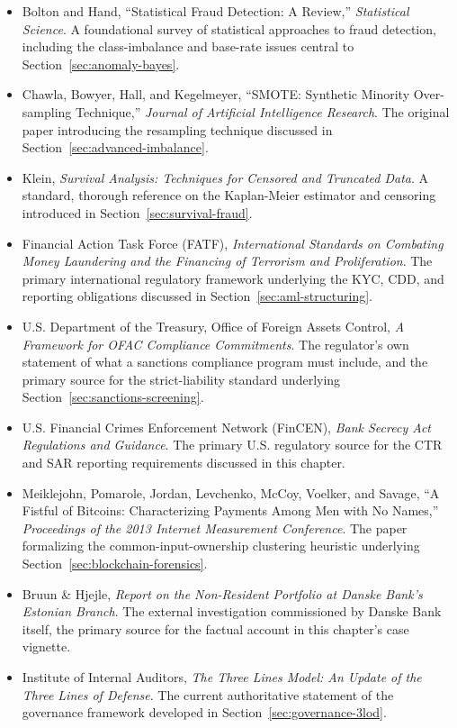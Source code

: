 \documentclass[../ai_in_finance]{subfiles}
\begin{document}
\begin{itemize}
    \item Bolton and Hand, ``Statistical Fraud Detection: A Review,'' \emph{Statistical Science}. A foundational survey of statistical approaches to fraud detection, including the class-imbalance and base-rate issues central to Section~\ref{sec:anomaly-bayes}.
    \item Chawla, Bowyer, Hall, and Kegelmeyer, ``SMOTE: Synthetic Minority Over-sampling Technique,'' \emph{Journal of Artificial Intelligence Research}. The original paper introducing the resampling technique discussed in Section~\ref{sec:advanced-imbalance}.
    \item Klein, \emph{Survival Analysis: Techniques for Censored and Truncated Data}. A standard, thorough reference on the Kaplan-Meier estimator and censoring introduced in Section~\ref{sec:survival-fraud}.
    \item Financial Action Task Force (FATF), \emph{International Standards on Combating Money Laundering and the Financing of Terrorism and Proliferation}. The primary international regulatory framework underlying the KYC, CDD, and reporting obligations discussed in Section~\ref{sec:aml-structuring}.
    \item U.S. Department of the Treasury, Office of Foreign Assets Control, \emph{A Framework for OFAC Compliance Commitments}. The regulator's own statement of what a sanctions compliance program must include, and the primary source for the strict-liability standard underlying Section~\ref{sec:sanctions-screening}.
    \item U.S. Financial Crimes Enforcement Network (FinCEN), \emph{Bank Secrecy Act Regulations and Guidance}. The primary U.S. regulatory source for the CTR and SAR reporting requirements discussed in this chapter.
    \item Meiklejohn, Pomarole, Jordan, Levchenko, McCoy, Voelker, and Savage, ``A Fistful of Bitcoins: Characterizing Payments Among Men with No Names,'' \emph{Proceedings of the 2013 Internet Measurement Conference}. The paper formalizing the common-input-ownership clustering heuristic underlying Section~\ref{sec:blockchain-forensics}.
    \item Bruun \& Hjejle, \emph{Report on the Non-Resident Portfolio at Danske Bank's Estonian Branch}. The external investigation commissioned by Danske Bank itself, the primary source for the factual account in this chapter's case vignette.
    \item Institute of Internal Auditors, \emph{The Three Lines Model: An Update of the Three Lines of Defense}. The current authoritative statement of the governance framework developed in Section~\ref{sec:governance-3lod}.
\end{itemize}
\end{document}

